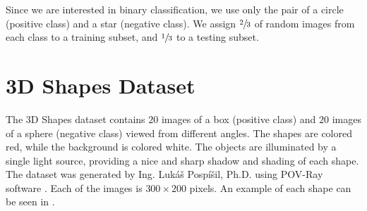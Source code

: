 Since we are interested in binary classification, we use only the pair of a circle (positive class) and a star (negative class). We assign $\sfrac{2}{3}$ of random images from each class to a training subset, and $\sfrac{1}{3}$ to a testing subset.

\section{3D Shapes Dataset}\label{sec:3d-dataset}
The 3D Shapes dataset contains $20$ images of a box (positive class) and $20$ images of a sphere (negative class) viewed from different angles. The shapes are colored red, while the background is colored white. The objects are illuminated by a single light source, providing a nice and sharp shadow and shading of each shape. The dataset was generated by Ing. Lukáš Pospíšil, Ph.D. using POV-Ray software \cite{povray}. Each of the images is $300\times200$ pixels. An example of each shape can be seen in .

